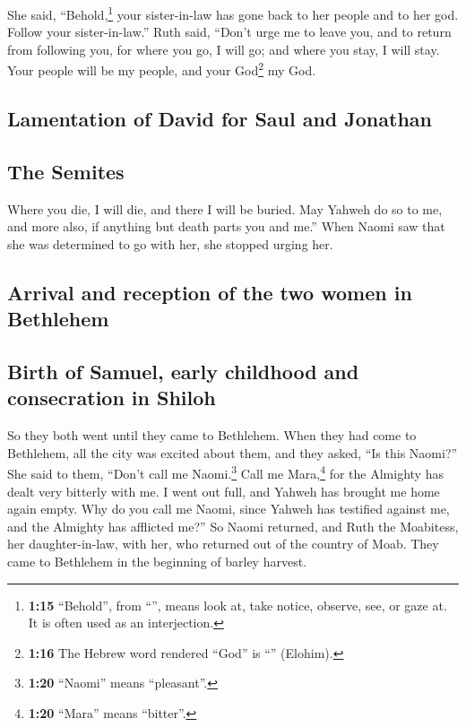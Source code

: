  She said, ``Behold,\footnote{\textbf{1:15} ``Behold'',
  from ``'', means look at, take notice, observe, see, or
  gaze at. It is often used as an interjection.} your sister-in-law has
gone back to her people and to her god. Follow your sister-in-law.''
 Ruth said, ``Don't urge me to leave you, and to return
from following you, for where you go, I will go; and where you stay, I
will stay. Your people will be my people, and your God\footnote{\textbf{1:16}
  The Hebrew word rendered ``God'' is ``'' (Elohim).} my
God.

\hypertarget{lamentation-of-david-for-saul-and-jonathan}{%
\subsection{Lamentation of David for Saul and
Jonathan}\label{lamentation-of-david-for-saul-and-jonathan}}

\hypertarget{the-semites}{%
\subsection{The Semites}\label{the-semites}}

 Where you die, I will die, and there I will be buried.
May Yahweh do so to me, and more also, if anything but death parts you
and me.''  When Naomi saw that she was determined to go
with her, she stopped urging her.

\hypertarget{arrival-and-reception-of-the-two-women-in-bethlehem}{%
\subsection{Arrival and reception of the two women in
Bethlehem}\label{arrival-and-reception-of-the-two-women-in-bethlehem}}

\hypertarget{birth-of-samuel-early-childhood-and-consecration-in-shiloh}{%
\subsection{Birth of Samuel, early childhood and consecration in
Shiloh}\label{birth-of-samuel-early-childhood-and-consecration-in-shiloh}}

 So they both went until they came to Bethlehem. When
they had come to Bethlehem, all the city was excited about them, and
they asked, ``Is this Naomi?''  She said to them, ``Don't
call me Naomi.\footnote{\textbf{1:20} ``Naomi'' means ``pleasant''.}
Call me Mara,\footnote{\textbf{1:20} ``Mara'' means ``bitter''.} for the
Almighty has dealt very bitterly with me.  I went out
full, and Yahweh has brought me home again empty. Why do you call me
Naomi, since Yahweh has testified against me, and the Almighty has
afflicted me?''  So Naomi returned, and Ruth the
Moabitess, her daughter-in-law, with her, who returned out of the
country of Moab. They came to Bethlehem in the beginning of barley
harvest.

